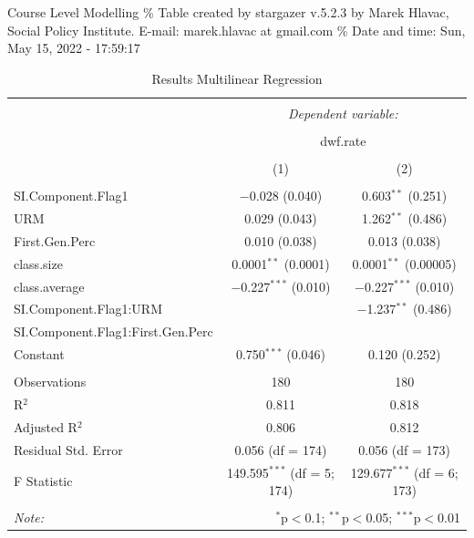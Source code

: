\documentclass[
  ignorenonframetext,
]{beamer}
\begin{document}
\begin{frame}{Course Level Modelling}
\protect\hypertarget{course-level-modelling}{}
\% Table created by stargazer v.5.2.3 by Marek Hlavac, Social Policy
Institute. E-mail: marek.hlavac at gmail.com \% Date and time: Sun, May
15, 2022 - 17:59:17

\begin{table}[!htbp] \centering 
  \caption{Results Multilinear Regression} 
  \label{} 
\begin{tabular}{@{\extracolsep{5pt}}lcc} 
\\[-1.8ex]\hline 
\hline \\[-1.8ex] 
 & \multicolumn{2}{c}{\textit{Dependent variable:}} \\ 
\cline{2-3} 
\\[-1.8ex] & \multicolumn{2}{c}{dwf.rate} \\ 
\\[-1.8ex] & (1) & (2)\\ 
\hline \\[-1.8ex] 
 SI.Component.Flag1 & $-$0.028 (0.040) & 0.603$^{**}$ (0.251) \\ 
  URM & 0.029 (0.043) & 1.262$^{**}$ (0.486) \\ 
  First.Gen.Perc & 0.010 (0.038) & 0.013 (0.038) \\ 
  class.size & 0.0001$^{**}$ (0.0001) & 0.0001$^{**}$ (0.00005) \\ 
  class.average & $-$0.227$^{***}$ (0.010) & $-$0.227$^{***}$ (0.010) \\ 
  SI.Component.Flag1:URM &  & $-$1.237$^{**}$ (0.486) \\ 
  SI.Component.Flag1:First.Gen.Perc &  &  \\ 
  Constant & 0.750$^{***}$ (0.046) & 0.120 (0.252) \\ 
 \hline \\[-1.8ex] 
Observations & 180 & 180 \\ 
R$^{2}$ & 0.811 & 0.818 \\ 
Adjusted R$^{2}$ & 0.806 & 0.812 \\ 
Residual Std. Error & 0.056 (df = 174) & 0.056 (df = 173) \\ 
F Statistic & 149.595$^{***}$ (df = 5; 174) & 129.677$^{***}$ (df = 6; 173) \\ 
\hline 
\hline \\[-1.8ex] 
\textit{Note:}  & \multicolumn{2}{r}{$^{*}$p$<$0.1; $^{**}$p$<$0.05; $^{***}$p$<$0.01} \\ 
\end{tabular} 
\end{table}


\end{frame}
\end{document}
